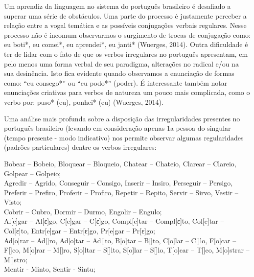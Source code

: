Um aprendiz da linguagem no sistema do português brasileiro é desafiado a superar uma série de obstáculos.  Uma parte do processo é justamente perceber a relação entre a vogal temática e as possíveis conjugações verbais regulares. Nesse processo não é incomum observarmos o surgimento de trocas de conjugação como: eu boti*, eu comei*, eu aprendei*, eu janti* (Wuerges, 2014). Outra dificuldade é ter de lidar com o fato de que os verbos irregulares no português apresentam, em pelo menos uma forma verbal de seu paradigma, alterações no radical e/ou na sua desinência. Isto fica evidente quando observamos a enunciação de formas como: “eu consego*” ou “eu podo*” (poder). É interessante também notar enunciações criativas para verbos de natureza um pouco mais complicada, como o verbo por:  puso* (eu), ponhei* (eu) (Wuerges, 2014).

Uma análise mais profunda sobre a disposição das irregularidades presentes no português brasileiro (levando em consideração apenas 1a pessoa do singular (tempo presente - modo indicativo) nos permite observar algumas regularidades (padrões particulares) dentre os verbos irregulares:\\

\begin{center}

Bobear – Bobeio, Bloquear – Bloqueio, Chatear – Chateio, Clarear – Clareio, Golpear – Golpeio;\\

Agredir – Agrido, Conseguir – Consigo, Inserir – Insiro, Perseguir – Persigo, Preferir – Prefiro, Proferir – Profiro, Repetir – Repito, Servir –  Sirvo, Vestir – Visto;\\

Cobrir – Cubro, Dormir – Durmo, Engolir – Engulo;\\

 Al[e]gar – Al[ε]go, C[e]gar – C[ε]go, Compl[e]tar – Compl[ε]to,  Col[e]tar – Col[ε]to, Entr[e]gar – Entr[ε]go, Pr[e]gar – Pr[ε]go;\\

Ad[o]rar – Ad[\textopeno]ro, Ad[o]tar – Ad[\textopeno]to, B[o]tar – B[\textopeno]to, C[o]lar – C[\textopeno]lo, F[o]car – F[\textopeno]co, M[o]rar – M[\textopeno]ro, S[o]ltar – S[\textopeno]lto, S[o]lar – S[\textopeno]lo, T[o]car – T[\textopeno]co, M[o]strar – M[\textopeno]stro;\\

Mentir - Minto, Sentir - Sintu;

\end{center}

